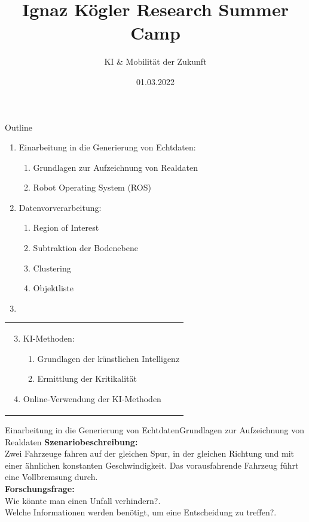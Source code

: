 \documentclass[169, handout	]{THIbeamer} %
\title{Ignaz Kögler Research Summer Camp}
\subtitle{KI \& Mobilität der Zukunft}
\date{01.03.2022}
\begin{document}
	\begin{frame}[plain]
		\maketitle
	\end{frame}
	\begin{frame}{Outline}
		\begin{minipage}{0.4\textwidth}
			\begin{enumerate}
				\item Einarbeitung in die Generierung von Echtdaten:
				\begin{enumerate}
					\item Grundlagen zur Aufzeichnung von Realdaten
					\item Robot Operating System (ROS)
				\end{enumerate}
				\item Datenvorverarbeitung:
				\begin{enumerate}
					\item Region of Interest
					\item Subtraktion der Bodenebene
					\item Clustering
					\item Objektliste
				\end{enumerate}
			\item[]
			\end{enumerate}
		\end{minipage}%
		\hfill
		\begin{minipage}{0.5\textwidth}
		\begin{tabular}{p{\textwidth}}
			\begin{enumerate}
				\setcounter{enumi}{2}	
				\item KI-Methoden: 				
				\begin{enumerate}
					\item Grundlagen der künstlichen Intelligenz					
					\item Ermittlung der Kritikalität	
				\end{enumerate}	
				\item Online-Verwendung der KI-Methoden
			\end{enumerate}
		\end{tabular}
		\end{minipage}%
	\end{frame}
\begin{frame}{Einarbeitung in die Generierung von Echtdaten}{Grundlagen zur Aufzeichnung von Realdaten}
	\textbf{Szenariobeschreibung:}\\
	Zwei Fahrzeuge fahren auf der gleichen Spur, in der gleichen Richtung und mit einer ähnlichen konstanten Geschwindigkeit. Das vorausfahrende Fahrzeug führt eine Vollbremsung durch.\\
	\textbf{Forschungsfrage:} \\
	Wie könnte man einen Unfall verhindern?.\\
Welche Informationen werden benötigt, um eine Entscheidung zu treffen?.
\end{frame}
\end{document}
